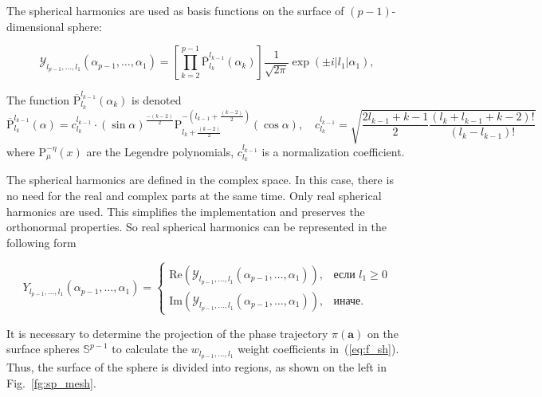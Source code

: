 \documentclass[12pt,twoside]{article}
\begin{document}
The spherical harmonics are used as basis functions on the surface of $(p-1)$-dimensional sphere:

\begin{equation}
	\mathcal{Y}_{l_{p-1},...,l_1}(\alpha_{p-1},\dots,\alpha_1) = 
	\left[
	    \prod\limits_{k = 2}^{p-1}
	    {\overline{\text{P}}}_{l_k}^{l_{k-1}}(\alpha_k)
	\right]
	    \frac{1}{\sqrt{2\pi}}
	    \exp{(\pm i |l_1| \alpha_1)},
\label{eq:YlN}
\end{equation}

The function ${\overline{\text{P}}}_{l_k}^{l_{k-1}}(\alpha_k)$ is denoted
\[
{\overline{\text{P}}}_{l_k}^{l_{k-1}}(\alpha) =
   c^{l_{k-1}}_{l_k} \cdot (\sin \alpha)^{\frac{-(k-2)}{2}}
   \text{P}^{-(l_{k-1}+\frac{(k-2)}{2})}_{l_k+\frac{(k-2)}{2}}(\cos \alpha),
   \quad
   c^{l_{k-1}}_{l_k} = 
        \sqrt{
	        \frac{2l_{k-1}+k-1}{2}
	        \frac{(l_k+l_{k-1}+k-2)!}{(l_k-l_{k-1})!}
	    }
\]
\noindent where $\text{P}_{\mu}^{-\eta}(x)$ are the Legendre polynomials, $c^{l_{k-1}}_{l_k}$ is a normalization coefficient. 

The spherical harmonics are defined in the complex space.
In this case, there is no need for the real and complex parts at the same time.
Only real spherical harmonics are used.
This simplifies the implementation and preserves the orthonormal properties.
So real spherical harmonics can be represented in the following form

\begin{equation}
	Y_{l_{p-1},...,l_1}(\alpha_{p-1},\dots,\alpha_1) = \begin{cases}
	\text{Re}(\mathcal{Y}_{l_{p-1},...,l_1}(\alpha_{p-1},\dots,\alpha_1)), & \mbox{если } l_1 \geq 0\\
    \text{Im}(\mathcal{Y}_{l_{p-1},...,l_1}(\alpha_{p-1},\dots,\alpha_1)), & \mbox{иначе}.
    \end{cases}
\label{eq:RTY}
\end{equation}

It is necessary to determine the projection of the phase trajectory $\pi(\mathbf{a})$ on the surface spheres $\mathbb{S}^{p-1}$ to calculate the $w_{l_{p-1},...,l_1}$ weight coefficients in~(\ref{eq:f_sh}).
Thus, the surface of the sphere is divided into regions, as shown on the left in Fig.~\ref{fg:sp_mesh}.
\end{document}
